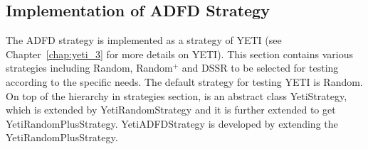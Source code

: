 




\subsection{Implementation of ADFD Strategy}\label{sec:implementation}
The ADFD strategy is implemented as a strategy of YETI (see Chapter~\ref{chap:yeti_3} for more details on YETI). This section contains various strategies including Random, Random$^+$ and DSSR to be selected for testing according to the specific needs. The default strategy for testing YETI is Random. On top of the hierarchy in strategies section, is an abstract class YetiStrategy, which is extended by YetiRandomStrategy and it is further extended to get YetiRandomPlusStrategy. YetiADFDStrategy is developed by extending the YetiRandomPlusStrategy.


